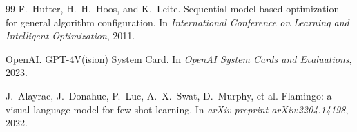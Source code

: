 \documentclass[12pt,a4paper,openany]{report}
\begin{document}
\begin{thebibliography}{99}
 F.~Hutter, H.~H.~Hoos, and K.~Leite. Sequential model-based optimization for general algorithm configuration. In \textit{International Conference on Learning and Intelligent Optimization}, 2011.


 OpenAI. GPT-4V(ision) System Card. In \textit{OpenAI System Cards and Evaluations}, 2023.

 J.~Alayrac, J.~Donahue, P.~Luc, A.~X.~Swat, D.~Murphy, et al. Flamingo: a visual language model for few-shot learning. In \textit{arXiv preprint arXiv:2204.14198}, 2022.

\end{thebibliography}
\end{document}
